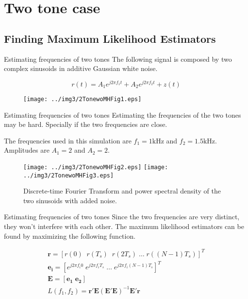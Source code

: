 ﻿\documentclass[mathserif]{beamer}
\begin{document}
	\section{Two tone case}
	\subsection{Finding Maximum Likelihood Estimators}
	
	\begin{frame}{Estimating frequencies of two tones}
		The following signal is composed by two complex sinusoids in additive Gaussian white noise.
		
		\begin{equation}
			r(t) = A_{1}e^{j2\pi f_1 t} + A_{2}e^{j2\pi f_2 t} + z(t)
		\end{equation}
	
		\begin{figure}
			\centering
			\texttt{[image: ../img3/2TonewoMHFig1.eps]}
		\end{figure}
	\end{frame}
	
	\begin{frame}{Estimating frequencies of two tones}
		Estimating the frequencies of the two tones may be hard. Specially if the two frequencies are close.
		
		The frequencies used in this simulation are $f_1 = 1\mathrm{kHz}$ and $f_2 = 1.5\mathrm{kHz}$. Amplitudes are $A_1 = 2$ and $A_2 = 2$.
	
		\begin{figure}
			\centering
			\texttt{[image: ../img3/2TonewoMHFig2.eps]}
			\texttt{[image: ../img3/2TonewoMHFig3.eps]}
			\caption{Discrete-time Fourier Transform and power spectral density of the two sinusoids with added noise.}
		\end{figure}
	\end{frame}
	
	\begin{frame}{Estimating frequencies of two tones}
		Since the two frequencies are very distinct, they won't interfere with each other. The maximum likelihood estimators can be found by maximizing the following function.
		
		\begin{gather*}
			\mathbf{r} =  [r(0) \; \; r(T_s) \; \; r(2T_s) \; \dots \; r((N-1)T_s)]^T \\
			\mathbf{e_i} =  [e^{j2\pi f_i0} \; e^{j2\pi f_iT_s} \; \dots \; e^{j2\pi f_i(N-1)T_s}]^T \\	
			\mathbf{E} = [\mathbf{e_1} \; \mathbf{e_2}]\\
			L(f_1,f_2) = \mathbf{r'E}(\mathbf{E'E})^{-1}\mathbf{E'r} \\
		\end{gather*}
		
	\end{frame}
	
\end{document}

